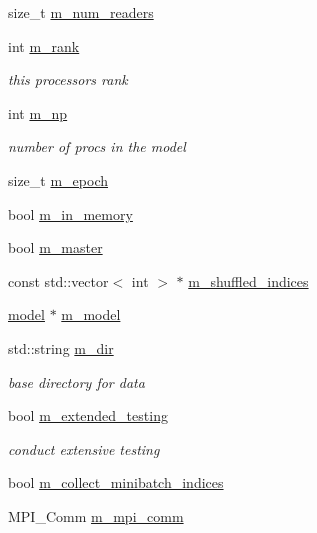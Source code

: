 \begin{DoxyCompactItemize}
size\+\_\+t \hyperlink{classlbann_1_1generic__data__store_a4381c1192e029d24c5b02cbd68988f77}{m\+\_\+num\+\_\+readers}
\item 
int \hyperlink{classlbann_1_1generic__data__store_a87695bfd2d1ed0dbe01d99108e3f68b7}{m\+\_\+rank}
\begin{DoxyCompactList}\small\item\em this processor\textquotesingle{}s rank \end{DoxyCompactList}\item 
int \hyperlink{classlbann_1_1generic__data__store_afcd4f99959c265c8c03dcf8ad3779d85}{m\+\_\+np}
\begin{DoxyCompactList}\small\item\em number of procs in the model \end{DoxyCompactList}\item 
size\+\_\+t \hyperlink{classlbann_1_1generic__data__store_a1b373d13815ed7f9a7c1dae20b236e91}{m\+\_\+epoch}
\item 
bool \hyperlink{classlbann_1_1generic__data__store_a1a9cc7b097cd7dd6ae0d12d52bb43ea1}{m\+\_\+in\+\_\+memory}
\item 
bool \hyperlink{classlbann_1_1generic__data__store_a143fd33ef3a53180bc62745e369c16f8}{m\+\_\+master}
\item 
const std\+::vector$<$ int $>$ $\ast$ \hyperlink{classlbann_1_1generic__data__store_ad456f747ee07f63df15c60833dfb82ad}{m\+\_\+shuffled\+\_\+indices}
\item 
\hyperlink{classlbann_1_1model}{model} $\ast$ \hyperlink{classlbann_1_1generic__data__store_acf2fb76306c75f52de0d6ea92b0f38fc}{m\+\_\+model}
\item 
std\+::string \hyperlink{classlbann_1_1generic__data__store_ab479c127f00ce550c7433b90e40a5a3d}{m\+\_\+dir}
\begin{DoxyCompactList}\small\item\em base directory for data \end{DoxyCompactList}\item 
bool \hyperlink{classlbann_1_1generic__data__store_a5e64702aa4a38c8533fa52944a8473d5}{m\+\_\+extended\+\_\+testing}
\begin{DoxyCompactList}\small\item\em conduct extensive testing \end{DoxyCompactList}\item 
bool \hyperlink{classlbann_1_1generic__data__store_aa8ce7dae1eeb256820ac4f99893a6d32}{m\+\_\+collect\+\_\+minibatch\+\_\+indices}
\item 
M\+P\+I\+\_\+\+Comm \hyperlink{classlbann_1_1generic__data__store_ae2d2d61d5d766a7f525eedcb05e0dbf6}{m\+\_\+mpi\+\_\+comm}
\end{DoxyCompactItemize}


